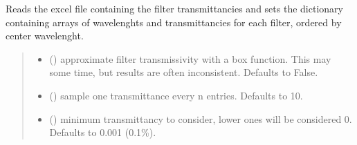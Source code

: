 \documentclass[letterpaper,10pt,english]{sphinxmanual}
\begin{document}
\begin{fulllineitems}
\label{\detokenize{doppler_dimming_lib:doppler_dimming_lib.codex.set_codex_transmittancies}}
\pysigstartsignatures
{}
\pysigstopsignatures
\sphinxAtStartPar
Reads the excel file containing the filter transmittancies and sets the dictionary containing arrays of wavelenghts and transmittancies for each filter, ordered by center wavelenght.
\begin{quote}\begin{description}
\begin{itemize}
\item {} 
\sphinxAtStartPar
{} (\sphinxstyleliteralemphasis{\sphinxupquote{, }}) \textendash{} approximate filter transmissivity with a box function. This may some time, but results are often inconsistent. Defaults to False.

\item {} 
\sphinxAtStartPar
{} (\sphinxstyleliteralemphasis{\sphinxupquote{, }}) \textendash{} sample one transmittance every n entries. Defaults to 10.

\item {} 
\sphinxAtStartPar
{} (\sphinxstyleliteralemphasis{\sphinxupquote{, }}) \textendash{} minimum transmittancy to consider, lower ones will be considered 0. Defaults to 0.001 (0.1\%).

\end{itemize}

\end{description}\end{quote}

\end{fulllineitems}
\end{document}
